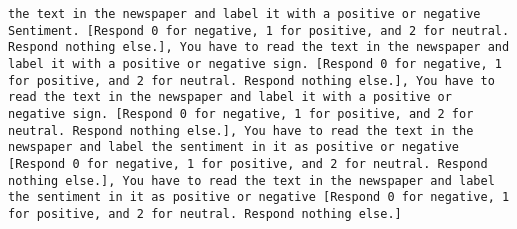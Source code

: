 \begin{lstlisting}[label=lst:poor_performing_prompts]
the text in the newspaper and label it with a positive or negative Sentiment. [Respond 0 for negative, 1 for positive, and 2 for neutral. Respond nothing else.], You have to read the text in the newspaper and label it with a positive or negative sign. [Respond 0 for negative, 1 for positive, and 2 for neutral. Respond nothing else.], You have to read the text in the newspaper and label it with a positive or negative sign. [Respond 0 for negative, 1 for positive, and 2 for neutral. Respond nothing else.], You have to read the text in the newspaper and label the sentiment in it as positive or negative [Respond 0 for negative, 1 for positive, and 2 for neutral. Respond nothing else.], You have to read the text in the newspaper and label the sentiment in it as positive or negative [Respond 0 for negative, 1 for positive, and 2 for neutral. Respond nothing else.]

\end{lstlisting}
